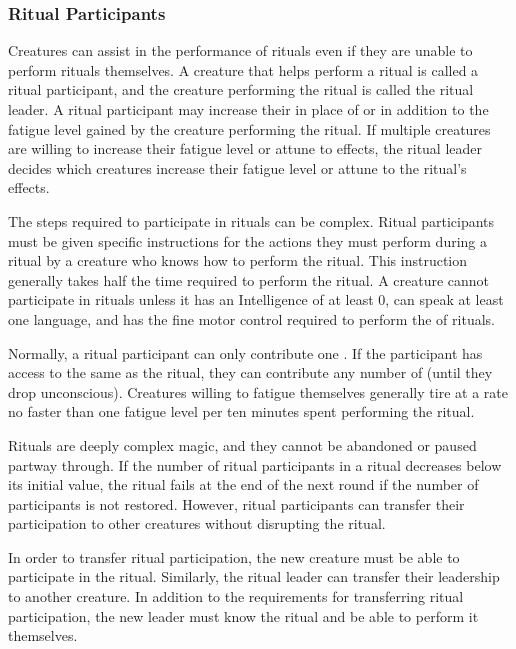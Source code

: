         \subsubsection{Ritual Participants}
            Creatures can assist in the performance of rituals even if they are unable to perform rituals themselves.
            A creature that helps perform a ritual is called a ritual participant, and the creature performing the ritual is called the ritual leader.
            A ritual participant may increase their  in place of or in addition to the fatigue level gained by the creature performing the ritual.
            If multiple creatures are willing to increase their fatigue level or attune to effects, the ritual leader decides which creatures increase their fatigue level or attune to the ritual's effects.

            The steps required to participate in rituals can be complex.
            Ritual participants must be given specific instructions for the actions they must perform during a ritual by a creature who knows how to perform the ritual.
            This instruction generally takes half the time required to perform the ritual.
            A creature cannot participate in rituals unless it has an Intelligence of at least 0, can speak at least one language, and has the fine motor control required to perform the  of rituals.

            Normally, a ritual participant can only contribute one .
            If the participant has access to the same  as the ritual, they can contribute any number of  (until they drop unconscious).
            Creatures willing to fatigue themselves generally tire at a rate no faster than one fatigue level per ten minutes spent performing the ritual.

            Rituals are deeply complex magic, and they cannot be abandoned or paused partway through.
            If the number of ritual participants in a ritual decreases below its initial value, the ritual fails at the end of the next round if the number of participants is not restored.
            However, ritual participants can transfer their participation to other creatures without disrupting the ritual.

            In order to transfer ritual participation, the new creature must be able to participate in the ritual.
            Similarly, the ritual leader can transfer their leadership to another creature.
            In addition to the requirements for transferring ritual participation, the new leader must know the ritual and be able to perform it themselves.

